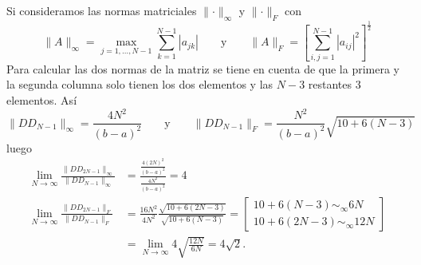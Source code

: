 \documentclass[12pt]{article}
\newcommand{\abs}[1]{\left|#1\right|}
\newcommand{\norm}[1]{\lVert #1\rVert}
\theoremstyle{definition}
\begin{document}
Si consideramos las normas matriciales $\norm{\cdot}_\infty$ y $\norm{\cdot}_F$ con
$$\norm{A}_\infty = \max_{j = 1,\dots, N - 1}\sum_{k=1}^{N-1}\abs{a_{jk}} \quad \quad \text{y} \quad \quad \norm{A}_F = \left[\sum_{i,j=1}^{N-1}\abs{a_{ij}}^2\right]^{\frac{1}{2}}$$
Para calcular las dos normas de la matriz se tiene en cuenta de que la primera y la segunda columna solo tienen los dos elementos y las $N - 3$ restantes 3 elementos. Así
$$\norm{DD_{N-1}}_\infty = \frac{4 N^2}{(b - a)^2}\quad \quad \text{y} \quad \quad \norm{DD_{N-1}}_F = \frac{N^2}{(b-a)^2}\sqrt{10 + 6(N - 3)}$$
luego
\begin{align*}
	\lim_{N\to\infty}\frac{\norm{DD_{2N-1}}_\infty}{\norm{DD_{N-1}}_\infty} &= \frac{\frac{4 (2 N)^2}{(b-a)^2}}{\frac{4 N^2}{(b-a)^2}} = 4 \\
	\lim_{N\to\infty}\frac{\norm{DD_{2N-1}}_F}{\norm{DD_{N-1}}_F} &= \frac{16 N^2}{4N^2}\frac{\sqrt{10 + 6(2N - 3)}}{\sqrt{10 + 6(N - 3)}} = \left[\begin{matrix}
		10 + 6(N - 3) \sim_\infty 6N \\
		10 + 6(2N - 3) \sim_\infty 12N
	\end{matrix}\right]  \\
	&= \lim_{N\to\infty} 4 \sqrt{\frac{12 N }{6 N}} = 4 \sqrt{2}.
\end{align*}
\end{document}
